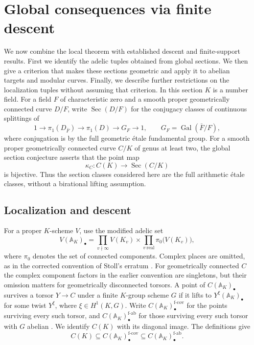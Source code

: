 \section{Global consequences via finite descent}\label{sec:global-sections}

We now combine the local theorem with established descent and
finite-support results. First we identify the adelic tuples obtained
from global sections. We then
give a criterion that makes these sections geometric and apply it to
abelian targets and modular curves. Finally, we describe further
restrictions on the localization tuples without assuming that criterion.
In this section $K$ is a number field. For a
field $F$ of characteristic zero and a smooth proper geometrically
connected curve $D/F$, write $\operatorname{Sec}(D/F)$ for the
conjugacy classes of continuous splittings of
\[
 1\longrightarrow\pi_1(D_{\bar F})\longrightarrow\pi_1(D)
   \longrightarrow G_F\longrightarrow1,
 \qquad G_F=\operatorname{Gal}(\bar F/F),
\]
where conjugation is by the full geometric \'etale fundamental group.
For a smooth proper geometrically connected curve $C/K$ of genus at
least two, the global section conjecture asserts that the point map
\[
 \kappa_C:C(K)\longrightarrow\operatorname{Sec}(C/K)
\]
is bijective. Thus the section classes considered here are the full
arithmetic \'etale classes, without a birational lifting assumption.

\subsection{Localization and descent}\label{subsec:global-localization}

For a proper $K$-scheme $V$, use the modified adelic set
\[
 V(\mathbb A_K)_\bullet
 =\prod_{v\nmid\infty}V(K_v)
  \times\prod_{v\ \mathrm{real}}\pi_0\bigl(V(K_v)\bigr),
\]
where $\pi_0$ denotes the set of connected components. Complex places
are omitted, as in the corrected convention of Stoll's erratum
\cite[Section~1]{StollFiniteDescentErrata}. For geometrically connected
$C$ the complex component factors in the earlier convention are
singletons, but their omission matters for geometrically disconnected torsors.
A point of $C(\mathbb A_K)_\bullet$ survives a torsor $Y\to C$ under a
finite $K$-group scheme $G$ if it lifts to
$Y^\xi(\mathbb A_K)_\bullet$ for some twist $Y^\xi$, where
$\xi\in H^1(K,G)$.
Write $C(\mathbb A_K)_\bullet^{\mathrm{f\text{-}cov}}$ for the points
surviving every such torsor, and
$C(\mathbb A_K)_\bullet^{\mathrm{f\text{-}ab}}$ for those surviving
every such torsor with $G$ abelian
\cite[Definitions~5.2 and~5.4]{StollFiniteDescent}. We identify $C(K)$ with its
diagonal image. The definitions give
\begin{equation}\label{eq:descent-inclusions}
 C(K)\subseteq C(\mathbb A_K)_\bullet^{\mathrm{f\text{-}cov}}
 \subseteq C(\mathbb A_K)_\bullet^{\mathrm{f\text{-}ab}}.
\end{equation}

